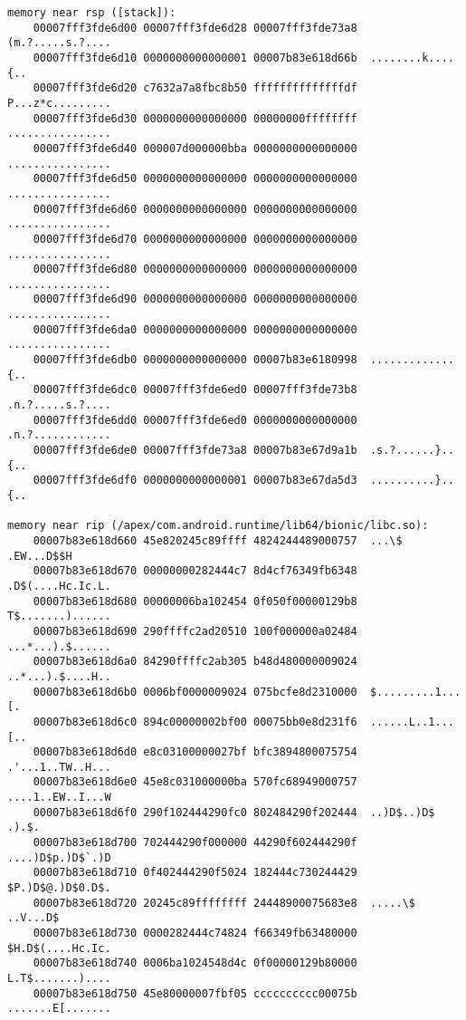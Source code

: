 \begin{lstlisting}
memory near rsp ([stack]):
    00007fff3fde6d00 00007fff3fde6d28 00007fff3fde73a8  (m.?.....s.?....
    00007fff3fde6d10 0000000000000001 00007b83e618d66b  ........k....{..
    00007fff3fde6d20 c7632a7a8fbc8b50 ffffffffffffffdf  P...z*c.........
    00007fff3fde6d30 0000000000000000 00000000ffffffff  ................
    00007fff3fde6d40 000007d000000bba 0000000000000000  ................
    00007fff3fde6d50 0000000000000000 0000000000000000  ................
    00007fff3fde6d60 0000000000000000 0000000000000000  ................
    00007fff3fde6d70 0000000000000000 0000000000000000  ................
    00007fff3fde6d80 0000000000000000 0000000000000000  ................
    00007fff3fde6d90 0000000000000000 0000000000000000  ................
    00007fff3fde6da0 0000000000000000 0000000000000000  ................
    00007fff3fde6db0 0000000000000000 00007b83e6180998  .............{..
    00007fff3fde6dc0 00007fff3fde6ed0 00007fff3fde73b8  .n.?.....s.?....
    00007fff3fde6dd0 00007fff3fde6ed0 0000000000000000  .n.?............
    00007fff3fde6de0 00007fff3fde73a8 00007b83e67d9a1b  .s.?......}..{..
    00007fff3fde6df0 0000000000000001 00007b83e67da5d3  ..........}..{..

memory near rip (/apex/com.android.runtime/lib64/bionic/libc.so):
    00007b83e618d660 45e820245c89ffff 4824244489000757  ...\$ .EW...D$$H
    00007b83e618d670 00000000282444c7 8d4cf76349fb6348  .D$(....Hc.Ic.L.
    00007b83e618d680 00000006ba102454 0f050f00000129b8  T$.......)......
    00007b83e618d690 290ffffc2ad20510 100f000000a02484  ...*...).$......
    00007b83e618d6a0 84290ffffc2ab305 b48d480000009024  ..*...).$....H..
    00007b83e618d6b0 0006bf0000009024 075bcfe8d2310000  $.........1...[.
    00007b83e618d6c0 894c00000002bf00 00075bb0e8d231f6  ......L..1...[..
    00007b83e618d6d0 e8c03100000027bf bfc3894800075754  .'...1..TW..H...
    00007b83e618d6e0 45e8c031000000ba 570fc68949000757  ....1..EW..I...W
    00007b83e618d6f0 290f102444290fc0 802484290f202444  ..)D$..)D$ .).$.
    00007b83e618d700 702444290f000000 44290f602444290f  ....)D$p.)D$`.)D
    00007b83e618d710 0f402444290f5024 182444c730244429  $P.)D$@.)D$0.D$.
    00007b83e618d720 20245c89ffffffff 24448900075683e8  .....\$ ..V...D$
    00007b83e618d730 0000282444c74824 f66349fb63480000  $H.D$(....Hc.Ic.
    00007b83e618d740 0006ba1024548d4c 0f00000129b80000  L.T$.......)....
    00007b83e618d750 45e80000007fbf05 cccccccccc00075b  .......E[.......


\end{lstlisting}
